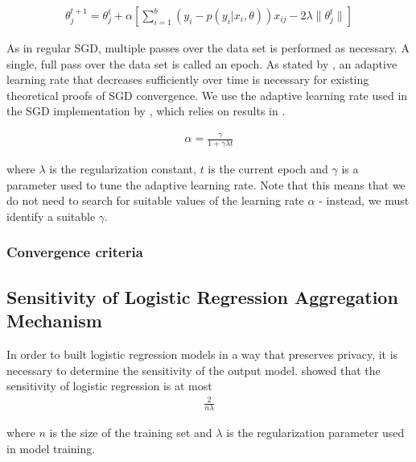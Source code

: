 \begin{eqnarray}
\theta^{t+1}_j = \theta^{t}_j + \alpha[\sum_{i=1}^{b}(y_i - p(y_i | x_i,\theta))x_{ij} - 2\lambda \|\theta^{t}_j\|]
\end{eqnarray}

As in regular SGD, multiple passes over the data set is performed as necessary. A single, full pass over the data set is called an epoch. As stated by \cite{cotter2011batchsgd}, an adaptive learning rate that decreases sufficiently over time is necessary for existing theoretical proofs of SGD convergence. We use the adaptive learning rate used in the SGD implementation by \cite{bottou2011sgd}, which relies on results in \citep{xu2010learningrate}.

\begin{eqnarray}
\label{eq:learning_rate}
\alpha = \frac{\gamma}{1 + \gamma\lambda t}
\end{eqnarray}

where $\lambda$ is the regularization constant, $t$ is the current epoch and $\gamma$ is a parameter used to tune the adaptive learning rate. Note that this means that we do not need to search for suitable values of the learning rate $\alpha$ - instead, we must identify a suitable $\gamma$.

\subsubsection{Convergence criteria}


\subsection{Sensitivity of Logistic Regression Aggregation Mechanism} \label{sec:Sensitivity_of_LogReg}

In order to built logistic regression models in a way that preserves privacy, it is necessary to determine the sensitivity of the output model. \cite{chaudhuri2009logistic} showed that the sensitivity of logistic regression is at most 
\begin{eqnarray}\label{eq:logres_sensitivity}
\frac{2}{n\lambda}
\end{eqnarray}

where $n$ is the size of the training set and $\lambda$ is the regularization parameter used in model training.


